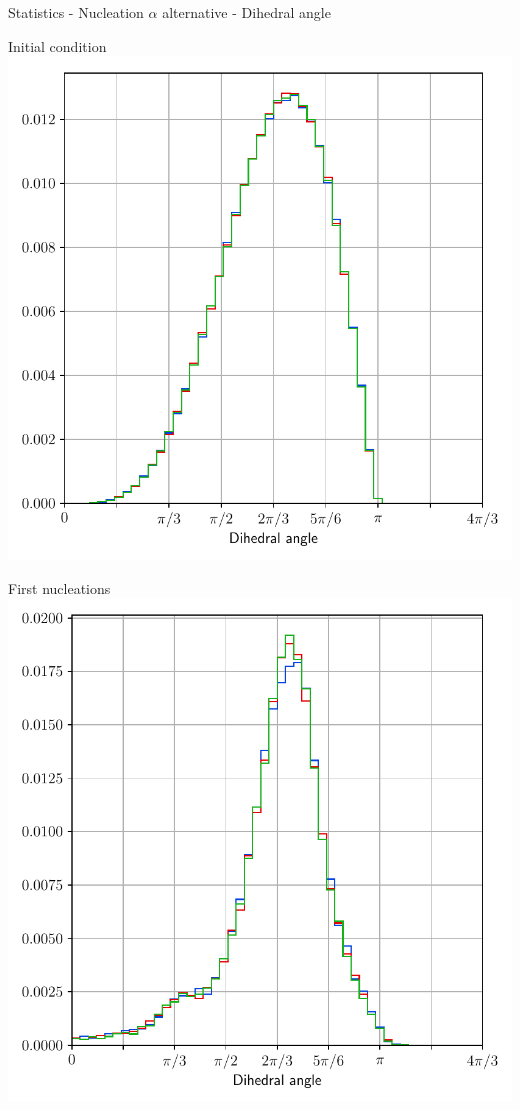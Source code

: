 \documentclass[usenames,dvipsnames]{beamer}
\begin{document}
\begin{frame}{Statistics - Nucleation $\alpha$ alternative - Dihedral angle}
    \begin{minipage}{0.5\textwidth}
    \centering
    \scriptsize
    Initial condition
    \includegraphics[trim={0 2.6em 0 1.1em},clip=true,scale=0.34]{figures/stored_energy/SE/dihedral/000000_nuclalternative_set.pdf}
    \end{minipage}%
    \begin{minipage}{0.5\textwidth}
    \centering
    \scriptsize
    First nucleations
    \includegraphics[trim={0 2.6em 0 1.1em},clip=true,scale=0.34]{figures/stored_energy/SE/dihedral/000070_nuclalternative_set.pdf}

\end{minipage}
\end{frame}
\end{document}
